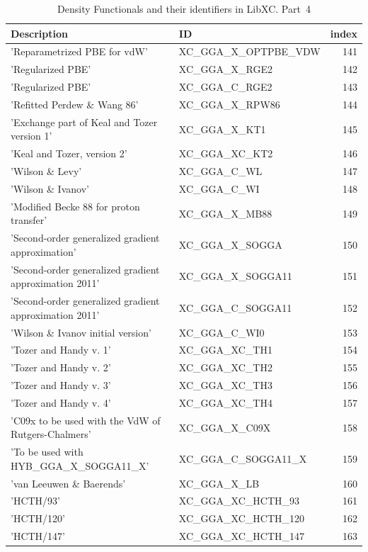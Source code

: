 \documentclass[final,12pt,makeidx,DIV=calc]{article}
\begin{document}
{{{{{{\begin{table}[!h]
\caption{Density Functionals and their identifiers in LibXC. Part~4}
\begin{center}
\begin{tabular}{llr}
\hline
\hline
Description & ID & index\\
\hline
  'Reparametrized PBE for vdW' & XC\_GGA\_X\_OPTPBE\_VDW  &141\\
  'Regularized PBE' & XC\_GGA\_X\_RGE2  &142\\
  'Regularized PBE' & XC\_GGA\_C\_RGE2  &143\\
  'Refitted Perdew \& Wang 86' & XC\_GGA\_X\_RPW86  &144\\
  'Exchange part of Keal and Tozer version 1' & XC\_GGA\_X\_KT1  &145\\
  'Keal and Tozer, version 2' & XC\_GGA\_XC\_KT2  &146\\
  'Wilson \& Levy' & XC\_GGA\_C\_WL  &147\\
  'Wilson \& Ivanov' & XC\_GGA\_C\_WI  &148\\
  'Modified Becke 88 for proton transfer' & XC\_GGA\_X\_MB88  &149\\
  'Second-order generalized gradient approximation' & XC\_GGA\_X\_SOGGA  &150\\
  'Second-order generalized gradient approximation 2011' & XC\_GGA\_X\_SOGGA11  &151\\
  'Second-order generalized gradient approximation 2011' & XC\_GGA\_C\_SOGGA11  &152\\
  'Wilson \& Ivanov initial version' & XC\_GGA\_C\_WI0  &153\\
  'Tozer and Handy v. 1' & XC\_GGA\_XC\_TH1  &154\\
  'Tozer and Handy v. 2' & XC\_GGA\_XC\_TH2  &155\\
  'Tozer and Handy v. 3' & XC\_GGA\_XC\_TH3  &156\\
  'Tozer and Handy v. 4' & XC\_GGA\_XC\_TH4  &157\\
  'C09x to be used with the VdW of Rutgers-Chalmers' & XC\_GGA\_X\_C09X  &158\\
  'To be used with HYB\_GGA\_X\_SOGGA11\_X' & XC\_GGA\_C\_SOGGA11\_X  &159\\
  'van Leeuwen \& Baerends' & XC\_GGA\_X\_LB  &160\\
  'HCTH/93' & XC\_GGA\_XC\_HCTH\_93  &161\\
  'HCTH/120' & XC\_GGA\_XC\_HCTH\_120  &162\\
  'HCTH/147' & XC\_GGA\_XC\_HCTH\_147  &163\\

\end{tabular}
\end{center}
\end{table}}}}}}}
\end{document}
